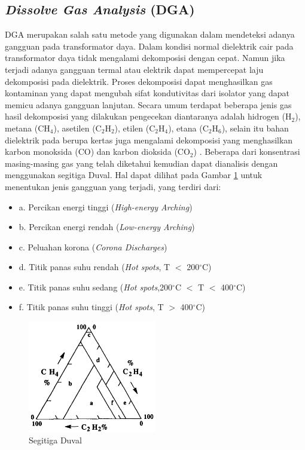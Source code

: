 \subsection{\textit{Dissolve Gas Analysis} (DGA)}
DGA merupakan salah satu metode yang digunakan dalam mendeteksi adanya gangguan pada transformator daya. Dalam kondisi normal dielektrik cair pada transformator daya tidak mengalami dekomposisi dengan cepat. Namun jika terjadi adanya gangguan termal atau elektrik dapat mempercepat laju dekomposisi pada dielektrik. Proses dekomposisi dapat menghasilkan gas kontaminan yang dapat mengubah sifat kondutivitas dari isolator yang dapat memicu adanya gangguan lanjutan. Secara umum terdapat beberapa jenis gas hasil dekomposisi yang dilakukan pengecekan diantaranya adalah hidrogen (H$_2$), metana (CH$_4$), asetilen (C$_2$H$_2$), etilen (C$_2$H$_4$), etana (C$_2$H$_6$), selain itu bahan dielektrik pada berupa kertas juga mengalami dekomposisi yang menghasilkan karbon monoksida (CO) dan karbon dioksida (CO$_2$) \cite{ahmed2013power}. Beberapa dari konsentrasi masing-masing gas yang telah diketahui kemudian dapat dianalisis dengan menggunakan segitiga Duval\cite{duval1989dissolved}. Hal dapat dilihat pada Gambar \ref{gambar:duval triangle} untuk menentukan jenis gangguan yang terjadi, yang terdiri dari:

\begin{itemize}
	\item[] a. Percikan energi tinggi (\textit{High-energy Arching})
	\item[] b. Percikan energi rendah (\textit{Low-energy Arching})
	\item[] c. Peluahan korona (\textit{Corona Discharges})
	\item[] d. Titik panas suhu rendah (\textit{Hot spots}, T $<$ 200$^{\circ}$C)
	\item[] e. Titik panas suhu sedang (\textit{Hot spots},200$^{\circ}$C $<$ T $<$ 400$^{\circ}$C)
	\item[] f. Titik panas suhu tinggi (\textit{Hot spots}, T $>$ 400$^{\circ}$C)
\end{itemize}

\begin{figure}[h]
	\begin{center}
    \includegraphics[width=0.5\textwidth]{BAB-2/figures/duval triangle.png}	
	    \caption{Segitiga Duval \cite{duval1989dissolved}}
	    \label{gambar:duval triangle}
	\end{center}
\end{figure}

